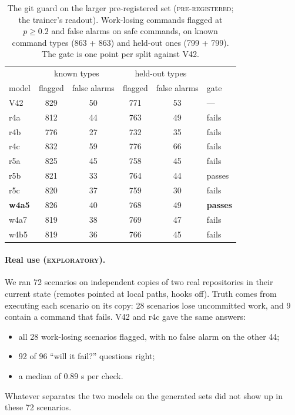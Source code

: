\documentclass[11pt]{article}
\newcommand{\prereg}{\textsc{pre-registered}}
\newcommand{\explo}{\textsc{exploratory}}
\begin{document}
\begin{table}[t]\centering\small
\caption{The git guard on the larger pre-registered set (\prereg; the trainer's readout). Work-losing commands flagged at
$p \ge 0.2$ and false alarms on safe commands, on known command types (863 + 863) and held-out ones (799 + 799). The gate
is one point per split against V42.}
\label{tab:guard}
\begin{tabular}{lcccc|l}
\toprule
 & \multicolumn{2}{c}{known types} & \multicolumn{2}{c|}{held-out types} & \\
model & flagged & false alarms & flagged & false alarms & gate \\
\midrule
V42 & 829 & 50 & 771 & 53 & --- \\
r4a & 812 & 44 & 763 & 49 & fails \\
r4b & 776 & 27 & 732 & 35 & fails \\
r4c & 832 & 59 & 776 & 66 & fails \\
r5a & 825 & 45 & 758 & 45 & fails \\
r5b & 821 & 33 & 764 & 44 & passes \\
r5c & 820 & 37 & 759 & 30 & fails \\
\midrule
\textbf{w4a5} & 826 & 40 & 768 & 49 & \textbf{passes} \\
w4a7 & 819 & 38 & 769 & 47 & fails \\
w4b5 & 819 & 36 & 766 & 45 & fails \\
\bottomrule
\end{tabular}
\end{table}

\paragraph{Real use (\explo).} We ran 72 scenarios on independent copies of two real repositories in their current
state (remotes pointed at local paths, hooks off). Truth comes from executing each scenario on its copy: 28 scenarios
lose uncommitted work, and 9 contain a command that fails. V42 and r4c gave the same answers:
\begin{itemize}
  \item all 28 work-losing scenarios flagged, with no false alarm on the other 44;
  \item 92 of 96 ``will it fail?'' questions right;
  \item a median of 0.89 s per check.
\end{itemize}
Whatever separates the two models on the generated sets did not show up in these 72 scenarios.
\end{document}
